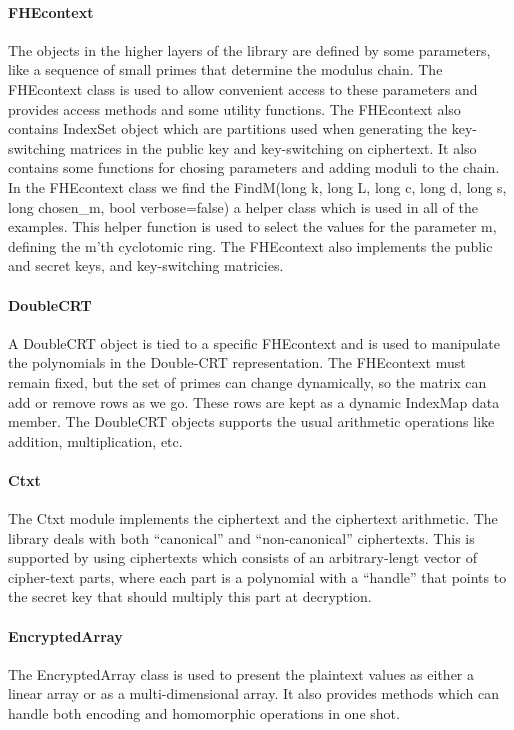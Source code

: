 \paragraph{FHEcontext}
The objects in the higher layers of the library are defined by some parameters, like a sequence of small primes that determine the modulus chain. The FHEcontext class is used to allow convenient access to these parameters and provides access methods and some utility functions. The FHEcontext also contains IndexSet object which are partitions used when generating the key-switching matrices in the public key and key-switching on ciphertext. It also contains some functions for chosing parameters and adding moduli to the chain. In the FHEcontext class we find the FindM(long k, long L, long c, long d, long s, long chosen\_m, bool verbose=false) a helper class which is used in all of the examples. This helper function is used to select the values for the parameter m, defining the m'th cyclotomic ring. The FHEcontext also implements the public and secret keys, and key-switching matricies.

\paragraph{DoubleCRT}
A DoubleCRT object is tied to a specific FHEcontext and is used to manipulate the polynomials in the Double-CRT representation. The FHEcontext must remain fixed, but the set of primes can change dynamically, so the matrix can add or remove rows as we go. These rows are kept as a dynamic IndexMap data member. The DoubleCRT objects supports the usual arithmetic operations like addition, multiplication, etc.

\paragraph{Ctxt}
The Ctxt module implements the ciphertext and the ciphertext arithmetic. The library deals with both ``canonical'' and ``non-canonical'' ciphertexts. This is supported by using ciphertexts which consists of an arbitrary-lengt vector of cipher-text parts, where each part is a polynomial with a ``handle'' that points to the secret key that should multiply this part at decryption\cite{halevi2013design}.

\paragraph{EncryptedArray}
The EncryptedArray class is used to present the plaintext values as either a linear array or as a multi-dimensional array. It also provides methods which can handle both encoding and homomorphic operations in one shot.

